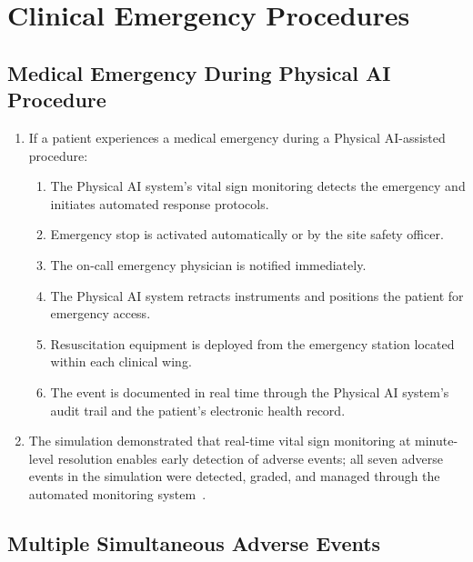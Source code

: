 \section{Clinical Emergency Procedures}

\subsection{Medical Emergency During Physical AI Procedure}

\begin{enumerate}[label=(\alph*)]
\item If a patient experiences a medical emergency during a Physical AI-assisted
  procedure:
  \begin{enumerate}[label=(\arabic*)]
  \item The Physical AI system's vital sign monitoring detects the emergency
    and initiates automated response protocols.
  \item Emergency stop is activated automatically or by the site safety officer.
  \item The on-call emergency physician is notified immediately.
  \item The Physical AI system retracts instruments and positions the patient
    for emergency access.
  \item Resuscitation equipment is deployed from the emergency station located
    within each clinical wing.
  \item The event is documented in real time through the Physical AI system's
    audit trail and the patient's electronic health record.
  \end{enumerate}

\item The simulation demonstrated that real-time vital sign monitoring at
  minute-level resolution enables early detection of adverse events; all
  seven adverse events in the simulation were detected, graded, and managed
  through the automated monitoring
  system~\cite{newtrial2026}.
\end{enumerate}

\subsection{Multiple Simultaneous Adverse Events}

